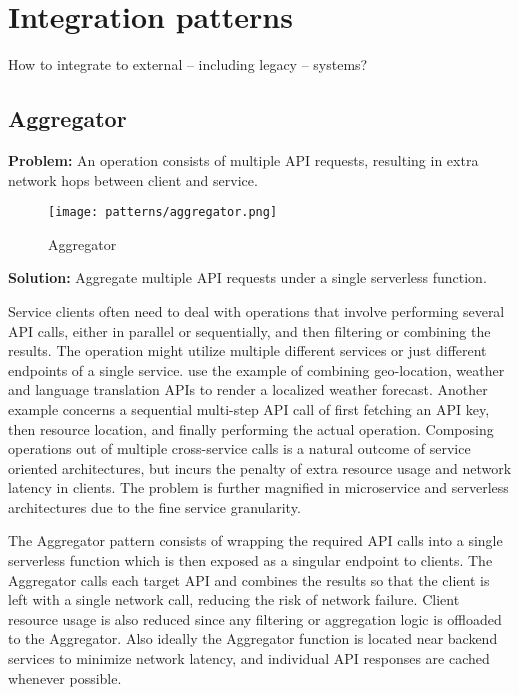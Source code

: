 \section{Integration patterns} \label{sec:integrationPatterns}

How to integrate to external -- including legacy -- systems?

\subsection{Aggregator} \label{subsec:aggregator}

\textbf{Problem:} An operation consists of multiple API requests, resulting in extra network hops between client and service.

\begin{figure}[h]
  \centering
  \texttt{[image: patterns/aggregator.png]}
  \caption{Aggregator}
  \label{fig:aggregator}
\end{figure}

\textbf{Solution:} Aggregate multiple API requests under a single serverless function.

Service clients often need to deal with operations that involve performing several API calls, either in parallel or sequentially, and then filtering or combining the results. The operation might utilize multiple different services or just different endpoints of a single service. \textcite{baldini17currentTrends} use the example of combining geo-location, weather and language translation APIs to render a localized weather forecast. Another example concerns a sequential multi-step API call of first fetching an API key, then resource location, and finally performing the actual operation. Composing operations out of multiple cross-service calls is a natural outcome of service oriented architectures, but incurs the penalty of extra resource usage and network latency in clients. The problem is further magnified in microservice and serverless architectures due to the fine service granularity. \parencite{microsoft18cloudPatterns}

The Aggregator pattern consists of wrapping the required API calls into a single serverless function which is then exposed as a singular endpoint to clients. The Aggregator calls each target API and combines the results so that the client is left with a single network call, reducing the risk of network failure. Client resource usage is also reduced since any filtering or aggregation logic is offloaded to the Aggregator. Also ideally the Aggregator function is located near backend services to minimize network latency, and individual API responses are cached whenever possible. \parencite{baldini17currentTrends}


